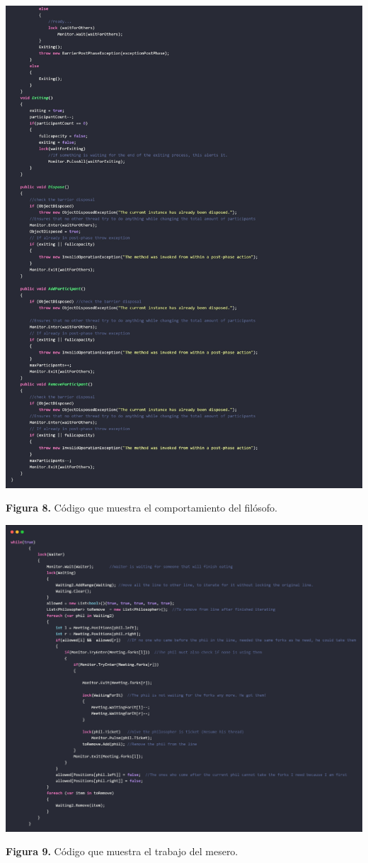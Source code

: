 \documentclass[10pt]{article} %
\newcommand{\imgcaption}[2]{\tiny \textbf{Figura #1.} #2.}
\begin{document}
\begin{center}
	\includegraphics[width=15cm]{Philosopher_Live3.jpg}
	
	\imgcaption{8}{C\'odigo que muestra el comportamiento del fil\'osofo}
\end{center}

\begin{center}
	\includegraphics[width=15cm]{Philosopher_InfiniteLoop.jpg}
	
	\imgcaption{9}{C\'odigo que muestra el trabajo del mesero}
\end{center}
\end{document}
